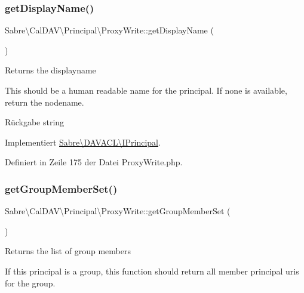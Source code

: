 \subsubsection{\texorpdfstring{get\+Display\+Name()}{getDisplayName()}}
{\footnotesize\ttfamily Sabre\textbackslash{}\+Cal\+D\+A\+V\textbackslash{}\+Principal\textbackslash{}\+Proxy\+Write\+::get\+Display\+Name (\begin{DoxyParamCaption}{ }\end{DoxyParamCaption})}

Returns the displayname

This should be a human readable name for the principal. If none is available, return the nodename.

\begin{DoxyReturn}{Rückgabe}
string 
\end{DoxyReturn}


Implementiert \mbox{\hyperlink{interface_sabre_1_1_d_a_v_a_c_l_1_1_i_principal_aff7f7f00c81458d5d9e20e28f4d32461}{Sabre\textbackslash{}\+D\+A\+V\+A\+C\+L\textbackslash{}\+I\+Principal}}.



Definiert in Zeile 175 der Datei Proxy\+Write.\+php.

\mbox{\label{class_sabre_1_1_cal_d_a_v_1_1_principal_1_1_proxy_write_ab735c1ecf155a532a098a4618f499afa}} 
\subsubsection{\texorpdfstring{get\+Group\+Member\+Set()}{getGroupMemberSet()}}
{\footnotesize\ttfamily Sabre\textbackslash{}\+Cal\+D\+A\+V\textbackslash{}\+Principal\textbackslash{}\+Proxy\+Write\+::get\+Group\+Member\+Set (\begin{DoxyParamCaption}{ }\end{DoxyParamCaption})}

Returns the list of group members

If this principal is a group, this function should return all member principal uri\textquotesingle{}s for the group.

